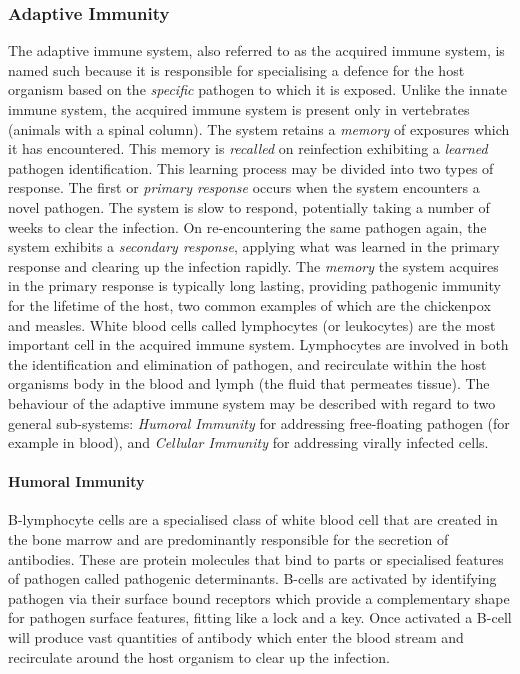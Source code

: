 %
%
\subsubsection{Adaptive Immunity}
The adaptive immune system, also referred to as the acquired immune system, is named such because it is responsible for specialising a defence for the host organism based on the \emph{specific} pathogen to which it is exposed. Unlike the innate immune system, the acquired immune system is present only in vertebrates (animals with a spinal column). The system retains a \emph{memory} of exposures which it has encountered. This memory is \emph{recalled} on reinfection exhibiting a \emph{learned} pathogen identification. This learning process may be divided into two types of response. The first or \emph{primary response} occurs when the system encounters a novel pathogen. The system is slow to respond, potentially taking a number of weeks to clear the infection. On re-encountering the same pathogen again, the system exhibits a \emph{secondary response}, applying what was learned in the primary response and clearing up the infection rapidly. The \emph{memory} the system acquires in the primary response is typically long lasting, providing pathogenic immunity for the lifetime of the host, two common examples of which are the chickenpox and measles. White blood cells called lymphocytes (or leukocytes) are the most important cell in the acquired immune system. Lymphocytes are involved in both the identification and elimination of pathogen, and recirculate within the host organisms body in the blood and lymph (the fluid that permeates tissue). The behaviour of the adaptive immune system may be described with regard to two general sub-systems: \emph{Humoral Immunity} for addressing free-floating pathogen (for example in blood), and \emph{Cellular Immunity} for addressing virally infected cells.

\paragraph{Humoral Immunity} B-lymphocyte cells are a specialised class of white blood cell that are created in the bone marrow and are predominantly responsible for the secretion of antibodies. These are protein molecules that bind to parts or specialised features of pathogen called pathogenic determinants. B-cells are activated by identifying pathogen via their surface bound receptors which provide a complementary shape for pathogen surface features, fitting like a lock and a key. Once activated a B-cell will produce vast quantities of antibody which enter the blood stream and recirculate around the host organism to clear up the infection.

